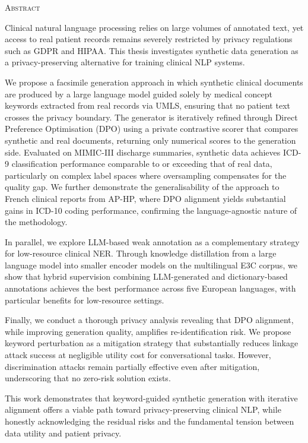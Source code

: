 \begin{center}
  \textsc{Abstract}
\end{center}
%
\noindent
%
Clinical natural language processing relies on large volumes of annotated text, yet access to real patient records remains severely restricted by privacy regulations such as GDPR and HIPAA.
This thesis investigates synthetic data generation as a privacy-preserving alternative for training clinical NLP systems.

We propose a facsimile generation approach in which synthetic clinical documents are produced by a large language model guided solely by medical concept keywords extracted from real records via UMLS, ensuring that no patient text crosses the privacy boundary.
The generator is iteratively refined through Direct Preference Optimisation (DPO) using a private contrastive scorer that compares synthetic and real documents, returning only numerical scores to the generation side.
Evaluated on MIMIC-III discharge summaries, synthetic data achieves ICD-9 classification performance comparable to or exceeding that of real data, particularly on complex label spaces where oversampling compensates for the quality gap.
We further demonstrate the generalisability of the approach to French clinical reports from AP-HP, where DPO alignment yields substantial gains in ICD-10 coding performance, confirming the language-agnostic nature of the methodology.

In parallel, we explore LLM-based weak annotation as a complementary strategy for low-resource clinical NER.
Through knowledge distillation from a large language model into smaller encoder models on the multilingual E3C corpus, we show that hybrid supervision combining LLM-generated and dictionary-based annotations achieves the best performance across five European languages, with particular benefits for low-resource settings.

Finally, we conduct a thorough privacy analysis revealing that DPO alignment, while improving generation quality, amplifies re-identification risk.
We propose keyword perturbation as a mitigation strategy that substantially reduces linkage attack success at negligible utility cost for conversational tasks.
However, discrimination attacks remain partially effective even after mitigation, underscoring that no zero-risk solution exists.

This work demonstrates that keyword-guided synthetic generation with iterative alignment offers a viable path toward privacy-preserving clinical NLP, while honestly acknowledging the residual risks and the fundamental tension between data utility and patient privacy.
